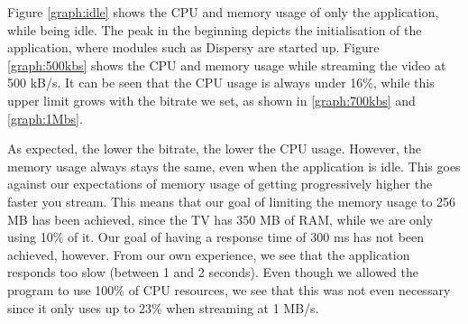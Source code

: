 Figure \ref{graph:idle} shows the CPU and memory usage of only the application, while being
idle.
The peak in the beginning depicts the initialisation of the application, where modules such
as Dispersy are started up.
Figure \ref{graph:500kbs} shows the CPU and memory usage while streaming the video at 500
kB/s. It can be seen that the CPU usage is
always under 16\%, while this upper limit grows with the bitrate we set, as shown in
\ref{graph:700kbs} and \ref{graph:1Mbs}.

As expected, the lower the bitrate, the lower the CPU usage. However, the memory usage
always stays the same, even when the application is idle. This goes against our
expectations of memory usage of getting progressively higher the faster you stream. This
means that our goal of limiting the memory usage to 256 MB has been achieved, since the TV
has 350 MB of RAM, while we are only using 10\% of it. Our goal of having a response time
of 300 ms has not been achieved, however. From our own experience, we see that the
application responds too slow (between 1 and 2 seconds). Even though we allowed the
program to use 100\% of CPU resources, we see that this was not even necessary since it
only uses up to 23\% when streaming at 1 MB/s.

